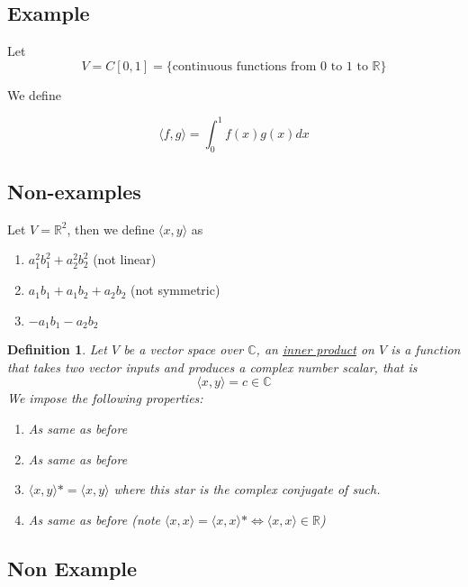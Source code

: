 \documentclass{article}
\newtheorem{definition}[theorem]{Definition}
\newtheorem{one minute paper}[theorem]{One Minute Paper}
\begin{document}
\subsection*{Example}
Let 
\begin{equation}
    V = C[0,1] = \{\text{continuous functions from 0 to 1 to $\mathbb{R}$}\}
\end{equation}

We define 

\begin{equation}
    \langle f, g \rangle  = \int_{0}^{1}f(x)g(x)dx
\end{equation}

\subsection*{Non-examples}

Let $V = \mathbb{R}^2$, then we define $\langle x, y \rangle$ as 
\begin{enumerate}
    \item $a_1^2b_1^2 + a_2^2b_2^2$ (not linear)
    \item $a_1b_1 + a_1b_2 + a_2b_2$ (not symmetric)
    \item $-a_1b_1 - a_2b_2$
\end{enumerate}

\begin{definition}
    Let $V$ be a vector space over $\mathbb{C}$, an \underline{inner product} on $V$ is a function that takes 
    two vector inputs and produces a complex number scalar, that is 
    \begin{equation}
        \langle x,y \rangle = c \in \mathbb{C}
    \end{equation}
    We impose the following properties:
    \begin{enumerate}
        \item As same as before
        \item As same as before
        \item $\langle x,y \rangle* = \langle x,y \rangle$ where this star is the complex conjugate of such.
        \item As same as before (note $\langle x,x \rangle = \langle x,x \rangle* \iff \langle x,x \rangle \in \mathbb{R}$)
    \end{enumerate}
\end{definition}

\subsection*{Non Example}
\end{document}
